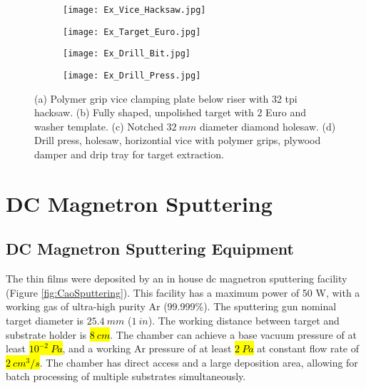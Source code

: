 \documentclass[a4paper,12pt,oneside]{report}%
\begin{document}
\begin{figure}[htbp]
	\centering
	\begin{subfigure}[htbp]{0.49\textwidth}
		\texttt{[image: Ex\_Vice\_Hacksaw.jpg]}
		\caption{}
		\label{fig:Vice}
	\end{subfigure}
	\begin{subfigure}[htbp]{0.38\textwidth}
		\texttt{[image: Ex\_Target\_Euro.jpg]}
		\caption{}
		\label{fig:TargetEuro}
	\end{subfigure}
	\begin{subfigure}[htbp]{0.275\textwidth}
		\texttt{[image: Ex\_Drill\_Bit.jpg]}
		\caption{}
		\label{fig:DrillBit}
	\end{subfigure}
	\begin{subfigure}[htbp]{0.30\textwidth}
		\texttt{[image: Ex\_Drill\_Press.jpg]}
		\caption{}
		\label{fig:DrillPress}
	\end{subfigure}
	\caption{(a) Polymer grip vice clamping plate below riser with 32 \acrshort{tpi} hacksaw. (b) Fully shaped, unpolished target with 2 Euro and washer template. (c) Notched $32~ mm$ diameter diamond holesaw. (d) Drill press, holesaw, horizontial vice with polymer grips, plywood damper and drip tray for target extraction.}%
	\label{fig:ShapingEquipment}
\end{figure}

\clearpage

\section{DC Magnetron Sputtering}
\subsection{DC Magnetron Sputtering Equipment}
The thin films were deposited by an in house \acrshort{dc} magnetron sputtering facility (Figure \ref{fig:CaoSputtering}). This facility has a maximum power of 50 W, with a working gas of ultra-high purity Ar (99.999\%). The sputtering gun nominal target diameter is $25.4~ mm$ ($1~ in$). The working distance between target and substrate holder is \hl{$8~ cm$}. The chamber can achieve a base vacuum pressure of at least \hl{$10^{-2}~ Pa$}, and a working Ar pressure of at least \hl{$2~ Pa$} at constant flow rate of \hl{$2~ cm^{3}/s$}. The chamber has direct access and a large deposition area, allowing for batch processing of multiple substrates simultaneously.
\end{document}
